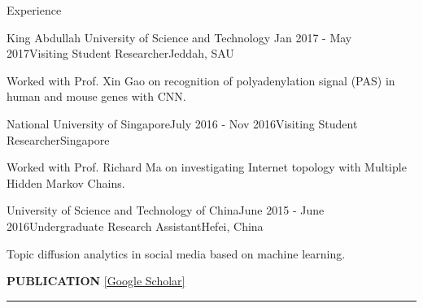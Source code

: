 \documentclass{resume} %
\begin{document}
\begin{rSection}{Experience}
\begin{rSubsection}{King Abdullah University of Science and Technology }{Jan 2017 - May 2017}{Visiting Student Researcher}{Jeddah, SAU}
\item Worked with Prof. Xin Gao on recognition of polyadenylation signal (PAS) in human and mouse genes with CNN.
\end{rSubsection}


\begin{rSubsection}{National University of Singapore}{July 2016 - Nov 2016}{Visiting Student Researcher}{Singapore}
\item Worked with Prof. Richard Ma on investigating Internet topology with Multiple Hidden Markov Chains.
\end{rSubsection}


\begin{rSubsection}{University of Science and Technology of China}{June 2015 - June 2016}{Undergraduate Research Assistant}{Hefei, China}
\item Topic diffusion analytics in social media based on machine learning.
\end{rSubsection}

\end{rSection}

\clearpage

\sectionskip
\MakeUppercase{\bf Publication} \href{https://scholar.google.com/citations?hl=en&user=Rc4ZMCEAAAAJ}{[Google Scholar]}
\sectionlineskip
\hrule %
\end{document}
